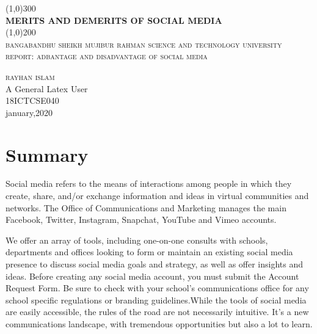 \documentclass[a4paper]{article}
\begin{document}
  \begin{titlepage}
  \begin{center}
  \line(1,0){300}\\
  [.25in]
  \huge{\bfseries MERITS AND DEMERITS OF SOCIAL MEDIA}\\
  [2mm]
  \line(1,0){200}\\
  [1.5cm]
  \textsc{\LARGE bangabandhu sheikh mujibur rahman science and technology university}\\
  [.75cm]
  \textsc{\Large report:  adbantage and disadvantage of social media }\\
  [10cm]
  \end{center}
  
  \begin{flushright}
  \textsc{\huge rayhan islam}\\
  A General Latex User\\
  18ICTCSE040\\
  january,2020
  \end{flushright}
  \end{titlepage}
  
 \section*{Summary}
 
Social media refers to the means of interactions among people in which they create, share, and/or exchange information and ideas in virtual communities and networks. The Office of Communications and Marketing manages the main Facebook, Twitter, Instagram, Snapchat, YouTube and Vimeo accounts.

We offer an array of tools, including one-on-one consults with schools, departments and offices looking to form or maintain an existing social media presence to discuss social media goals and strategy, as well as offer insights and ideas. Before creating any social media account, you must submit the Account Request Form. Be sure to check with your school’s communications office for any school specific regulations or branding guidelines.While the tools of social media are easily accessible, the rules of the road are not necessarily intuitive. It’s a new communications landscape, with tremendous opportunities but also a lot to learn.
\end{document}
